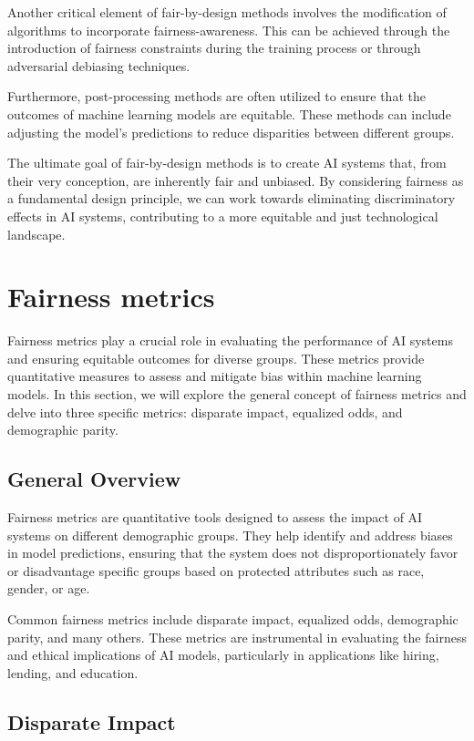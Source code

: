 \documentclass[12pt,a4paper,openright,twoside]{book}
\begin{document}
Another critical element of fair-by-design methods involves the modification of algorithms to incorporate fairness-awareness. This can be achieved through the introduction of fairness constraints during the training process or through adversarial debiasing techniques. 

Furthermore, post-processing methods are often utilized to ensure that the outcomes of machine learning models are equitable. These methods can include adjusting the model's predictions to reduce disparities between different groups. 

The ultimate goal of fair-by-design methods is to create AI systems that, from their very conception, are inherently fair and unbiased. By considering fairness as a fundamental design principle, we can work towards eliminating discriminatory effects in AI systems, contributing to a more equitable and just technological landscape. 

\newpage
\section{Fairness metrics}
\label{section:metrics}

Fairness metrics play a crucial role in evaluating the performance of AI systems and ensuring equitable outcomes for diverse groups. These metrics provide quantitative measures to assess and mitigate bias within machine learning models. In this section, we will explore the general concept of fairness metrics and delve into three specific metrics: disparate impact, equalized odds, and demographic parity.

\subsection{General Overview}

Fairness metrics are quantitative tools designed to assess the impact of AI systems on different demographic groups. They help identify and address biases in model predictions, ensuring that the system does not disproportionately favor or disadvantage specific groups based on protected attributes such as race, gender, or age.

Common fairness metrics include disparate impact, equalized odds, demographic parity, and many others. These metrics are instrumental in evaluating the fairness and ethical implications of AI models, particularly in applications like hiring, lending, and education.

\subsection{Disparate Impact}
\end{document}
